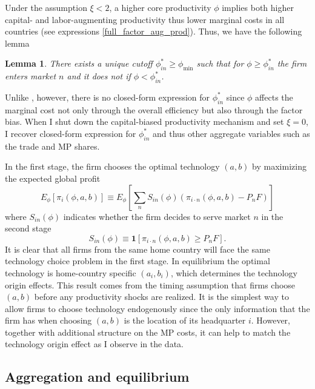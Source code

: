 \documentclass[notitlepage,11pt]{article}%
\newtheorem{lemma}{Lemma}
\begin{document}
Under the assumption $\xi<2$, a higher core productivity $\phi$ implies both
higher capital- and labor-augmenting productivity thus lower marginal costs in
all countries (see expressions \ref{full_factor_aug_prod}). Thus, we have the
following lemma

\begin{lemma}
There exists a unique cutoff $\phi_{in}^{\ast}\geq\phi_{\min}$ such that for
$\phi\geq\phi_{in}^{\ast}$ the firm enters market $n$ and it does not if
$\phi<\phi_{in}^{\ast}$.
\end{lemma}

Unlike \cite{arkolakis_innovation_2013}, however, there is no closed-form
expression for $\phi_{in}^{\ast}$ since $\phi$ affects the marginal cost not
only through the overall efficiency but also through the factor bias. When I
shut down the capital-biased productivity mechanism and set $\xi=0$, I recover
closed-form expression for $\phi_{in}^{\ast}$ and thus other aggregate
variables such as the trade and MP shares.

In the first stage, the firm chooses the optimal technology $\left(
a,b\right)  $ by maximizing the expected global profit%
\[
E_{\phi}\left[  \pi_{i}\left(  \phi,a,b\right)  \right]  \equiv E_{\phi
}\left[  \sum_{n}S_{in}\left(  \phi\right)  \left(  \pi_{i\cdot n}\left(
\phi,a,b\right)  -P_{n}F\right)  \right]
\]
where $S_{in}\left(  \phi\right)  $ indicates whether the firm decides to
serve market $n$ in the second stage%
\[
S_{in}\left(  \phi\right)  \equiv\mathbf{1}\left[  \pi_{i\cdot n}\left(
\phi,a,b\right)  \geq P_{n}F\right]  .
\]
It is clear that all firms from the same home country will face the same
technology choice problem in the first stage. In equilibrium the optimal
technology is home-country specific $\left(  a_{i},b_{i}\right)  $, which
determines the technology origin effects. This result comes from the timing
assumption that firms choose $\left(  a,b\right)  $ before any productivity
shocks are realized. It is the simplest way to allow firms to choose
technology endogenously since the only information that the firm has when
choosing $\left(  a,b\right)  $ is the location of its headquarter $i$.
However, together with additional structure on the MP costs, it can help to
match the technology origin effect as I observe in the data.

\subsection{Aggregation and equilibrium}
\end{document}
